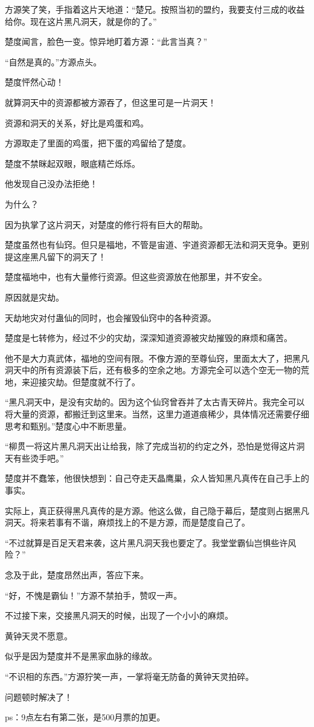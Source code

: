 \begin{this_body}
方源笑了笑，手指着这片天地道：“楚兄。按照当初的盟约，我要支付三成的收益给你。现在这片黑凡洞天，就是你的了。”

楚度闻言，脸色一变。惊异地盯着方源：“此言当真？”

“自然是真的。”方源点头。

楚度怦然心动！

就算洞天中的资源都被方源吞了，但这里可是一片洞天！

资源和洞天的关系，好比是鸡蛋和鸡。

方源取走了里面的鸡蛋，把下蛋的鸡留给了楚度。

楚度不禁眯起双眼，眼底精芒烁烁。

他发现自己没办法拒绝！

为什么？

因为执掌了这片洞天，对楚度的修行将有巨大的帮助。

楚度虽然也有仙窍。但只是福地，不管是宙道、宇道资源都无法和洞天竞争。更别提这座黑凡留下的洞天了！

楚度福地中，也有大量修行资源。但这些资源放在他那里，并不安全。

原因就是灾劫。

天劫地灾对付蛊仙的同时，也会摧毁仙窍中的各种资源。

楚度是七转修为，经过不少的灾劫，深深知道资源被灾劫摧毁的麻烦和痛苦。

他不是大力真武体，福地的空间有限。不像方源的至尊仙窍，里面太大了，把黑凡洞天中的所有资源装下后，还有极多的空余之地。方源完全可以选个空无一物的荒地，来迎接灾劫。但楚度就不行了。

“黑凡洞天中，是没有灾劫的。因为这个仙窍曾吞并了太古青天碎片。我完全可以将大量的资源，都搬迁到这里来。当然，这里力道道痕稀少，具体情况还需要仔细思考和甄别。”楚度心中不断思量。

“柳贯一将这片黑凡洞天出让给我，除了完成当初的约定之外，恐怕是觉得这片洞天有些烫手吧。”

楚度并不蠢笨，他很快想到：自己夺走天晶鹰巢，众人皆知黑凡真传在自己手上的事实。

实际上，真正获得黑凡真传的是方源。他这么做，自己隐于幕后，楚度则占据黑凡洞天。将来若事有不谐，麻烦找上的不是方源，而是楚度自己了。

“不过就算是百足天君来袭，这片黑凡洞天我也要定了。我堂堂霸仙岂惧些许风险？”

念及于此，楚度昂然出声，答应下来。

“好，不愧是霸仙！”方源不禁拍手，赞叹一声。

不过接下来，交接黑凡洞天的时候，出现了一个小小的麻烦。

黄钟天灵不愿意。

似乎是因为楚度并不是黑家血脉的缘故。

“不识相的东西。”方源狞笑一声，一掌将毫无防备的黄钟天灵拍碎。

问题顿时解决了！

ps：9点左右有第二张，是500月票的加更。

\end{this_body}

